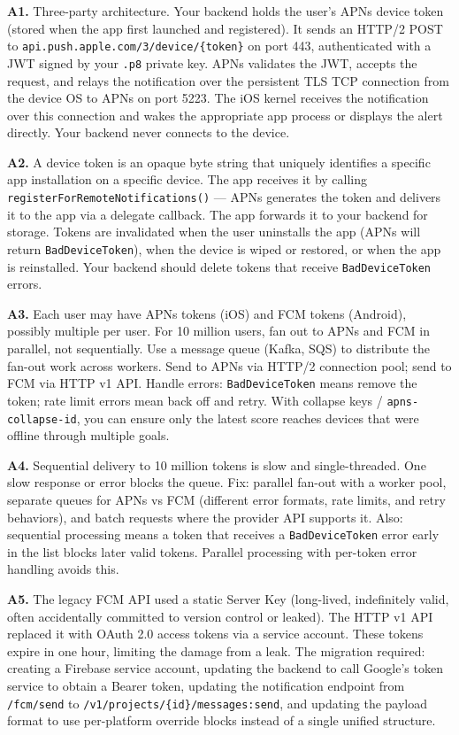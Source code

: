 \documentclass[11pt,a4paper]{article}
\begin{document}
\begin{answerbox}
\textbf{A1.} Three-party architecture. Your backend holds the user's APNs device token (stored when the app first launched and registered). It sends an HTTP/2 POST to \texttt{api.push.apple.com/3/device/\{token\}} on port 443, authenticated with a JWT signed by your \texttt{.p8} private key. APNs validates the JWT, accepts the request, and relays the notification over the persistent TLS TCP connection from the device OS to APNs on port 5223. The iOS kernel receives the notification over this connection and wakes the appropriate app process or displays the alert directly. Your backend never connects to the device.

\textbf{A2.} A device token is an opaque byte string that uniquely identifies a specific app installation on a specific device. The app receives it by calling \texttt{registerForRemoteNotifications()} --- APNs generates the token and delivers it to the app via a delegate callback. The app forwards it to your backend for storage. Tokens are invalidated when the user uninstalls the app (APNs will return \texttt{BadDeviceToken}), when the device is wiped or restored, or when the app is reinstalled. Your backend should delete tokens that receive \texttt{BadDeviceToken} errors.

\textbf{A3.} Each user may have APNs tokens (iOS) and FCM tokens (Android), possibly multiple per user. For 10 million users, fan out to APNs and FCM in parallel, not sequentially. Use a message queue (Kafka, SQS) to distribute the fan-out work across workers. Send to APNs via HTTP/2 connection pool; send to FCM via HTTP v1 API. Handle errors: \texttt{BadDeviceToken} means remove the token; rate limit errors mean back off and retry. With collapse keys / \texttt{apns-collapse-id}, you can ensure only the latest score reaches devices that were offline through multiple goals.

\textbf{A4.} Sequential delivery to 10 million tokens is slow and single-threaded. One slow response or error blocks the queue. Fix: parallel fan-out with a worker pool, separate queues for APNs vs FCM (different error formats, rate limits, and retry behaviors), and batch requests where the provider API supports it. Also: sequential processing means a token that receives a \texttt{BadDeviceToken} error early in the list blocks later valid tokens. Parallel processing with per-token error handling avoids this.

\textbf{A5.} The legacy FCM API used a static Server Key (long-lived, indefinitely valid, often accidentally committed to version control or leaked). The HTTP v1 API replaced it with OAuth 2.0 access tokens via a service account. These tokens expire in one hour, limiting the damage from a leak. The migration required: creating a Firebase service account, updating the backend to call Google's token service to obtain a Bearer token, updating the notification endpoint from \texttt{/fcm/send} to \texttt{/v1/projects/\{id\}/messages:send}, and updating the payload format to use per-platform override blocks instead of a single unified structure.
\end{answerbox}
\end{document}
